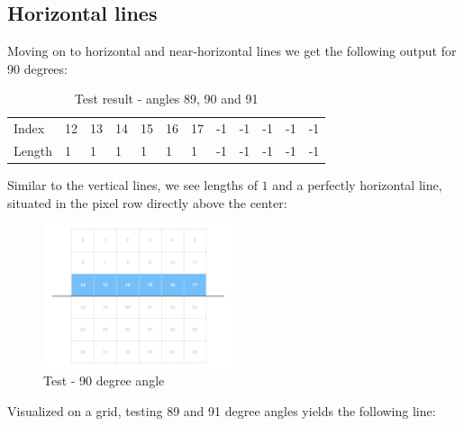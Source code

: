 \subsection*{Horizontal lines}
Moving on to horizontal and near-horizontal lines we get the following output for 90 degrees:
\begin{table}[H]
    \centering
    \caption{Test result - angles 89, 90 and 91}
    \begin{tabular}{llllllllllll}
    Index  & 12 & 13 & 14 & 15 & 16 & 17 & -1 & -1 & -1 & -1 & -1 \\
    Length & 1  & 1  & 1  & 1  & 1 & 1 & -1 & -1 & -1 & -1 & -1 
    \end{tabular}
\end{table}
Similar to the vertical lines, we see lengths of $1$ and a perfectly horizontal line, situated in the pixel row directly above the center:
\begin{figure}[H]
    \centering
    \caption{Test - 90 degree angle}
    \label{test90}
    \includegraphics[width=0.5\textwidth]{figures/test_90.png}
\end{figure}
Visualized on a grid, testing 89 and 91 degree angles yields the following line: 
